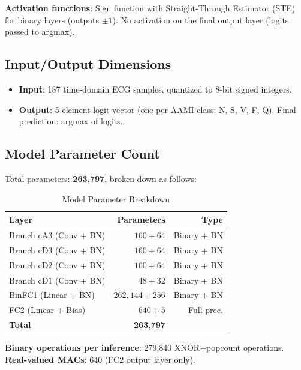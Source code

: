 \documentclass[conference]{IEEEtran}
\begin{document}
\textbf{Activation functions}: Sign function with Straight-Through Estimator (STE)~\cite{bengio2013estimating} for binary layers (outputs $\pm1$). No activation on the final output layer (logits passed to argmax).

\subsection{Input/Output Dimensions}

\begin{itemize}
    \item \textbf{Input}: 187 time-domain ECG samples, quantized to 8-bit signed integers.
    \item \textbf{Output}: 5-element logit vector (one per AAMI class: N, S, V, F, Q). Final prediction: argmax of logits.
\end{itemize}

\subsection{Model Parameter Count}

Total parameters: \textbf{263,797}, broken down as follows:

\begin{table}[htbp]
    \centering
    \caption{Model Parameter Breakdown}
    \label{tab:params}
    \begin{tabular}{lrr}
        \toprule
        \textbf{Layer} & \textbf{Parameters} & \textbf{Type} \\
        \midrule
        Branch cA3 (Conv + BN) & $160 + 64$ & Binary + BN \\
        Branch cD3 (Conv + BN) & $160 + 64$ & Binary + BN \\
        Branch cD2 (Conv + BN) & $160 + 64$ & Binary + BN \\
        Branch cD1 (Conv + BN) & $48 + 32$ & Binary + BN \\
        BinFC1 (Linear + BN) & $262{,}144 + 256$ & Binary + BN \\
        FC2 (Linear + Bias) & $640 + 5$ & Full-prec. \\
        \midrule
        \textbf{Total} & \textbf{263,797} & \\
        \bottomrule
    \end{tabular}
\end{table}

\textbf{Binary operations per inference}: 279,840 XNOR+popcount operations.\\
\textbf{Real-valued MACs}: 640 (FC2 output layer only).
\end{document}
